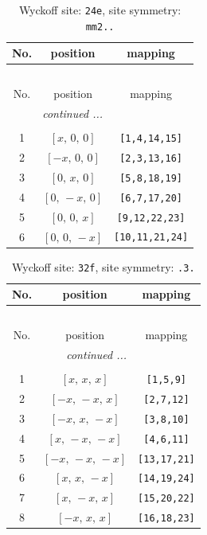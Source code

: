\documentclass[fleqn,8pt]{jsarticle}
\begin{document}
\renewcommand{\arraystretch}{1.2}
\begin{longtable}{ccc}
\caption{Wyckoff site: {\tt 24e}, site symmetry: {\tt mm2..}}
 \\
 \hline \hline
No. & position & mapping \\ \hline \endfirsthead

\multicolumn{2}{l}{\tablename\ \thetable{}} \\
 \hline \hline
No. & position & mapping \\ \hline \endhead

 \hline \hline
\multicolumn{2}{r}{\footnotesize\it continued ...} \\ \endfoot

 \hline \hline
\multicolumn{2}{r}{} \\ \endlastfoot

1 & $\left[ x,\, 0,\, 0 \right]$ & {\tt [1,4,14,15]} \\ \hline
2 & $\left[ - x,\, 0,\, 0 \right]$ & {\tt [2,3,13,16]} \\ \hline
3 & $\left[ 0,\, x,\, 0 \right]$ & {\tt [5,8,18,19]} \\ \hline
4 & $\left[ 0,\, - x,\, 0 \right]$ & {\tt [6,7,17,20]} \\ \hline
5 & $\left[ 0,\, 0,\, x \right]$ & {\tt [9,12,22,23]} \\ \hline
6 & $\left[ 0,\, 0,\, - x \right]$ & {\tt [10,11,21,24]} \\
\end{longtable}
\renewcommand{\arraystretch}{1.2}
\begin{longtable}{ccc}
\caption{Wyckoff site: {\tt 32f}, site symmetry: {\tt .3.}}
 \\
 \hline \hline
No. & position & mapping \\ \hline \endfirsthead

\multicolumn{2}{l}{\tablename\ \thetable{}} \\
 \hline \hline
No. & position & mapping \\ \hline \endhead

 \hline \hline
\multicolumn{2}{r}{\footnotesize\it continued ...} \\ \endfoot

 \hline \hline
\multicolumn{2}{r}{} \\ \endlastfoot

1 & $\left[ x,\, x,\, x \right]$ & {\tt [1,5,9]} \\ \hline
2 & $\left[ - x,\, - x,\, x \right]$ & {\tt [2,7,12]} \\ \hline
3 & $\left[ - x,\, x,\, - x \right]$ & {\tt [3,8,10]} \\ \hline
4 & $\left[ x,\, - x,\, - x \right]$ & {\tt [4,6,11]} \\ \hline
5 & $\left[ - x,\, - x,\, - x \right]$ & {\tt [13,17,21]} \\ \hline
6 & $\left[ x,\, x,\, - x \right]$ & {\tt [14,19,24]} \\ \hline
7 & $\left[ x,\, - x,\, x \right]$ & {\tt [15,20,22]} \\ \hline
8 & $\left[ - x,\, x,\, x \right]$ & {\tt [16,18,23]} \\
\end{longtable}
\end{document}
